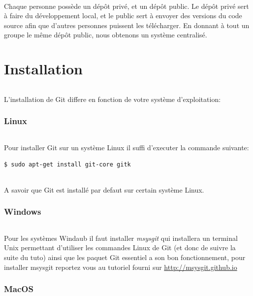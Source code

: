 \documentclass[french, a4paper, 12pt, titlepage]{article}
\begin{document}
\paragraph{} Chaque personne possède un dépôt privé, et un dépôt public.  Le dépôt privé sert à faire du développement local, et le public sert à envoyer des versions du code source afin que d'autres personnes puissent les télécharger.  En donnant à tout un groupe le même dépôt public, nous obtenons un système centralisé.


\part{Installation}
\paragraph{}L'installation de Git differe en fonction de votre système d'exploitation:
\section{Linux}
\paragraph{} Pour installer Git sur un système Linux il suffi d'executer la commande suivante:
\begin{lstlisting}
$ sudo apt-get install git-core gitk
\end{lstlisting}
\paragraph{}A savoir que Git est installé par defaut sur certain système Linux.

\section{Windows}
\paragraph{}Pour les systèmes Windaub il faut installer \emph{msysgit} qui installera un terminal Unix permettant d'utiliser les commandes Linux de Git (et donc de suivre la suite du tuto) ainsi que les paquet Git essentiel a son bon fonctionnement, pour installer msysgit reportez vous au tutoriel fourni sur \url{http://msysgit.github.io}

\section{MacOS}
\end{document}
